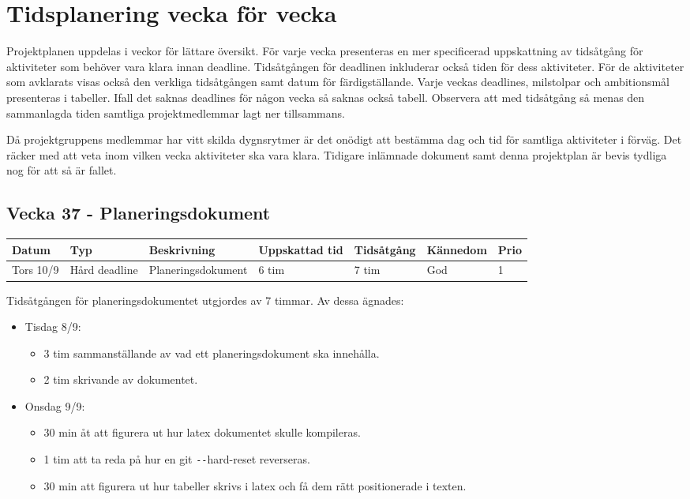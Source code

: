 \documentclass{TDP003mall}
\begin{document}
\section{Tidsplanering vecka för vecka}
Projektplanen uppdelas i veckor för lättare översikt. För varje vecka presenteras
 en mer specificerad uppskattning av tidsåtgång för aktiviteter som behöver vara
 klara innan deadline. Tidsåtgången för deadlinen inkluderar också tiden för dess
 aktiviteter. För de aktiviteter som avklarats visas också den verkliga tidsåtgången
 samt datum för färdigställande. Varje veckas deadlines, milstolpar och ambitionsmål presenteras
 i tabeller. Ifall det saknas deadlines för någon vecka så saknas också tabell. Observera att med tidsåtgång så menas den sammanlagda tiden samtliga projektmedlemmar lagt ner tillsammans.

 Då projektgruppens medlemmar har vitt skilda dygnsrytmer är det onödigt att bestämma dag och tid för samtliga aktiviteter i förväg. Det räcker med att veta inom vilken vecka aktiviteter ska vara klara. Tidigare inlämnade dokument samt denna projektplan är bevis tydliga nog för att så är fallet.

 \subsection*{Vecka 37 - Planeringsdokument}
 
\begin{tabularx}{\linewidth}{|l|l|X|l|l|l|l|}
	\hline
	Datum & Typ           & Beskrivning        & Uppskattad tid & Tidsåtgång & Kännedom & Prio \\ [0.5ex]
	\hline                                             
	Tors 10/9  & Hård deadline & Planeringsdokument & 6 tim             & 7 tim         & God      & 1    \\
	\hline
\end{tabularx}

Tidsåtgången för planeringsdokumentet utgjordes av 7 timmar. Av dessa ägnades:
\begin{itemize}
	\item Tisdag 8/9:
	\begin{itemize}
		\item 3 tim sammanställande av vad ett planeringsdokument ska innehålla.
		\item 2 tim skrivande av dokumentet.
	\end{itemize}
	\item Onsdag 9/9:
	\begin{itemize}
		\item 30 min åt att figurera ut hur latex dokumentet skulle kompileras.
		\item 1 tim att ta reda på hur en git \texttt{-{}-}hard-reset reverseras.
		\item 30 min att figurera ut hur tabeller skrivs i latex och få dem rätt positionerade i texten.\\
	\end{itemize}

      \end{itemize}
\end{document}
